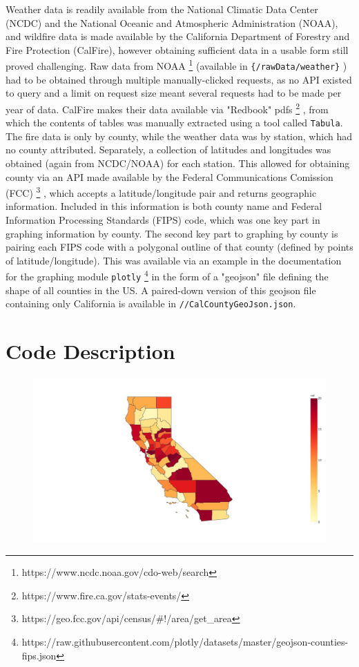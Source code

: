 \documentclass{article}
\begin{document}
Weather data is readily available from the National Climatic Data Center (NCDC) and the National Oceanic and Atmospheric Administration (NOAA), and wildfire data is made available by the California Department of Forestry and Fire Protection (CalFire), however obtaining sufficient data in a usable form still proved challenging. Raw data from NOAA
\footnote{https://www.ncdc.noaa.gov/cdo-web/search} (available in 
\lstinline|{/rawData/weather}|
) had to be obtained through multiple manually-clicked requests, as no API existed to query and a limit on request size meant several requests had to be made per year of data. CalFire makes their data available via "Redbook" pdfs
\footnote{https://www.fire.ca.gov/stats-events/}
, from which the contents of tables was manually extracted using a tool called \lstinline|Tabula|. The fire data is only by county, while the weather data was by station, which had no county attributed. Separately, a collection of latitudes and longitudes was obtained (again from NCDC/NOAA) for each station. This allowed for obtaining county via an API made available by the Federal Communications Comission (FCC)
\footnote{https://geo.fcc.gov/api/census/\#!/area/get\_area}
, which accepts a latitude/longitude pair and returns geographic information. Included in this information is both county name and Federal Information Processing Standards (FIPS) code, which was one key part in graphing information by county. The second key part to graphing by county is pairing each FIPS code with a polygonal outline of that county (defined by points of latitude/longitude). This was available via an example in the documentation for the graphing module 
\lstinline|plotly|
\footnote{https://raw.githubusercontent.com/plotly/datasets/master/geojson-counties-fips.json} in the form of a "geojson" file defining the shape of all counties in the US. A paired-down version of this geojson file containing only California is available in 
\lstinline|//CalCountyGeoJson.json|.

\section{Code Description}
\begin{figure}
	\includegraphics[width=.5\linewidth]{images/foo.jpg}
	\label{foo bar baz}
\end{figure}
\end{document}
